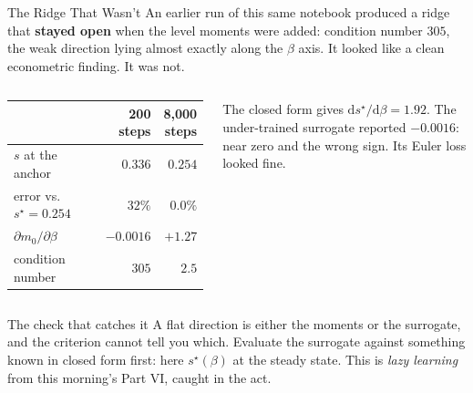 \documentclass[aspectratio=169,11pt]{beamer}
\newcommand{\emphc}[1]{\textcolor{harvardcrimson}{#1}}
\begin{document}
\begin{frame}{The Ridge That Wasn't}
\small
An earlier run of this same notebook produced a ridge that \textbf{stayed open} when the level moments were added: condition number $305$, the weak direction lying almost exactly along the $\beta$ axis. It looked like a clean econometric finding. It was not.

\vspace{0.15cm}
\begin{columns}[T]
\begin{center}
\footnotesize
\begin{tabular}{lrr}
\toprule
& \textbf{200 steps} & \textbf{8{,}000 steps} \\
\midrule
$s$ at the anchor & $0.336$ & $0.254$ \\
error vs.\ $s^\star = 0.254$ & \emphc{$32\%$} & $0.0\%$ \\
$\partial m_0 / \partial \beta$ & \emphc{$-0.0016$} & $+1.27$ \\
condition number & $305$ & $2.5$ \\
\bottomrule
\end{tabular}
\end{center}
The closed form gives $\mathrm{d}s^\star/\mathrm{d}\beta = 1.92$. The under-trained surrogate reported $-0.0016$: \emphc{near zero and the wrong sign}. Its Euler loss looked fine.
\end{columns}

\vspace{0.12cm}
\begin{alertblock}{The check that catches it}
A flat direction is either the moments or \emphc{the surrogate}, and the criterion cannot tell you which. Evaluate the surrogate against something known in closed form first: here $s^\star(\beta)$ at the steady state. This is \emph{lazy learning} from this morning's Part VI, caught in the act.
\end{alertblock}
\end{frame}
\end{document}
